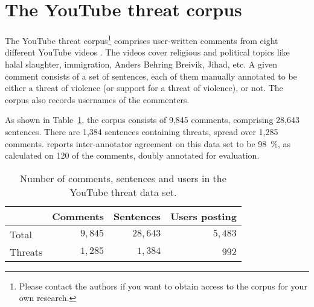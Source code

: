 \documentclass[11pt,letterpaper]{article}
\newcommand{\tov}{threat of violence}
\newcommand{\ds}{the YouTube threat data set}
\begin{document}
\section{The YouTube threat corpus}
\label{sec:data}
The YouTube threat corpus\footnote{Please contact the authors if you want to obtain access to the corpus for your own research.} comprises user-written comments from eight different YouTube videos \cite{hammer2014}. The videos cover religious and political topics like halal slaughter, immigration, Anders Behring Breivik, Jihad, etc. 
A given comment consists of a set of sentences, each of them manually annotated to be either a \tov{} (or support for a \tov{}), or not. The corpus also records usernames of the commenters.

As shown in Table~\ref{tab:dataset}, the corpus consists of 9,845 comments, comprising 28,643 sentences.
There are 1,384 sentences containing threats, spread over 1,285 comments.  reports inter-annotator agreement on this data set to be 98~\%, as calculated on 120 of the comments, doubly annotated for evaluation.

\begin{table}
  \begin{smaller}
    \begin{center}
      \begin{tabular}{lrrr}
        \toprule
  
        & Comments  & Sentences  & Users posting \\
        \midrule
	
  
        Total  & $9,845$  & $28,643$  & $5,483$  \\
        Threats  & $1,285$  & $1,384$  & $992$  \\
        \bottomrule

      \end{tabular}
      \caption{Number of comments, sentences and users in \ds{}.}
      \label{tab:dataset}
    \end{center}
  \end{smaller}
\end{table}
\end{document}
